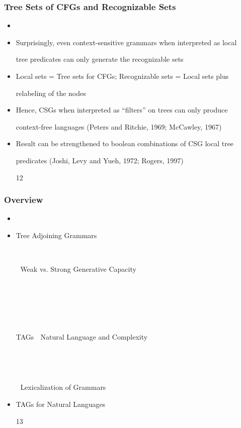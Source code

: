 \documentclass[compress,color=usenames]{beamer}
\begin{document}
\begin{frame}
\frametitle{Tree Sets of CFGs and Recognizable Sets}

\begin{itemize}
\item




\item Surprisingly, even context-sensitive grammars when interpreted as local


tree predicates can only generate the recognizable sets





\item Local sets = Tree sets for CFGs; Recognizable sets = Local sets plus


relabeling of the nodes





\item Hence, CSGs when interpreted as {``}ﬁlters'' on trees can only produce


context-free languages (Peters and Ritchie, 1969; McCawley, 1967)





\item Result can be strengthened to boolean combinations of CSG local tree


predicates (Joshi, Levy and Yueh, 1972; Rogers, 1997)


12




\end{itemize}

\end{frame}

\begin{frame}
\frametitle{Overview}


\begin{itemize}
\item



\item Tree Adjoining Grammars





 Weak vs. Strong Generative Capacity











TAGs  Natural Language and Complexity








 Lexicalization of Grammars





\item TAGs for Natural Languages





13




\end{itemize}

\end{frame}
\end{document}
